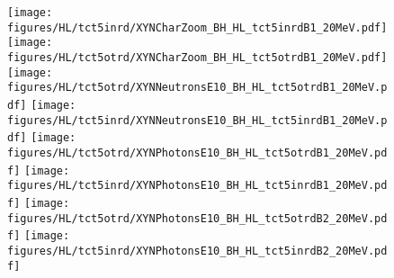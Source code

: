 \begin{figure}
  \begin{center}
    \texttt{[image: figures/HL/tct5inrd/XYNCharZoom\_BH\_HL\_tct5inrdB1\_20MeV.pdf]}
    \texttt{[image: figures/HL/tct5otrd/XYNCharZoom\_BH\_HL\_tct5otrdB1\_20MeV.pdf]} 
    \texttt{[image: figures/HL/tct5otrd/XYNNeutronsE10\_BH\_HL\_tct5otrdB1\_20MeV.pdf]}
    \texttt{[image: figures/HL/tct5inrd/XYNNeutronsE10\_BH\_HL\_tct5inrdB1\_20MeV.pdf]}
    \texttt{[image: figures/HL/tct5otrd/XYNPhotonsE10\_BH\_HL\_tct5otrdB1\_20MeV.pdf]}
    \texttt{[image: figures/HL/tct5inrd/XYNPhotonsE10\_BH\_HL\_tct5inrdB1\_20MeV.pdf]}
    \texttt{[image: figures/HL/tct5otrd/XYNPhotonsE10\_BH\_HL\_tct5otrdB2\_20MeV.pdf]}
    \texttt{[image: figures/HL/tct5inrd/XYNPhotonsE10\_BH\_HL\_tct5inrdB2\_20MeV.pdf]}

\end{center}
\vspace{-0.6cm}
 \caption{
  \label{fig:XYN}}
\end{figure}


